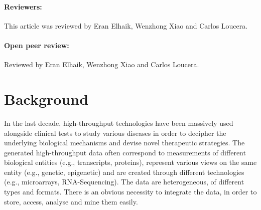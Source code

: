 \documentclass{bmcart}
\begin{document}
\begin{frontmatter}
\begin{abstractbox}
\begin{keyword}
\end{keyword}

\end{abstractbox}
%

\end{frontmatter}


\paragraph{Reviewers:}
This article was reviewed by Eran Elhaik, Wenzhong Xiao and Carlos Loucera.

\clearpage
\newpage
\paragraph{Open peer review:}
Reviewed by Eran Elhaik, Wenzhong Xiao and Carlos Loucera. 
\clearpage
\newpage

\section{Background}

In the last decade, high-throughput technologies have been massively
used alongside clinical tests to study various diseases in order to
decipher the underlying biological mechanisms and devise novel
therapeutic strategies. The generated high-throughput data often
correspond to measurements of different biological entities (e.g.,
transcripts, proteins), represent various views on the same entity
(e.g., genetic, epigenetic) and are created through different
technologies (e.g., microarrays, RNA-Sequencing). The data are
heterogeneous, of different types and formats. There is an obvious
necessity to integrate the data, in order to store, access, analyse and 
mine them easily. 
\end{document}
